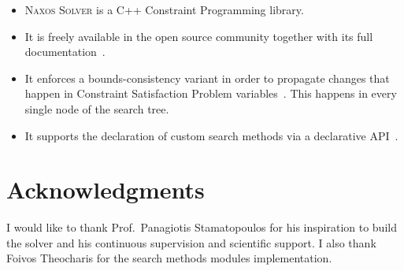\documentclass[a4paper]{article}
\begin{document}
\title{}

\author{Nikolaos Pothitos}


\date{}

\maketitle

\begin{itemize}
  \item \textsc{Naxos Solver} is a C++ Constraint
        Programming library.
  \item It is freely available in the open source community
        together with its full documentation~\cite{Naxos}.
  \item It enforces a bounds-consistency variant in order to
        propagate changes that happen in Constraint
        Satisfaction Problem variables~\cite{TODO}. This
        happens in every single node of the search tree.
  \item It supports the declaration of custom search methods
        via a declarative API~\cite{Pothitos2017}.
\end{itemize}

\section*{Acknowledgments}

I would like to thank Prof.\ Panagiotis Stamatopoulos for
his inspiration to build the solver and his continuous
supervision and scientific support. I also thank Foivos
Theocharis for the search methods modules implementation.

\nocite{*}


\end{document}
